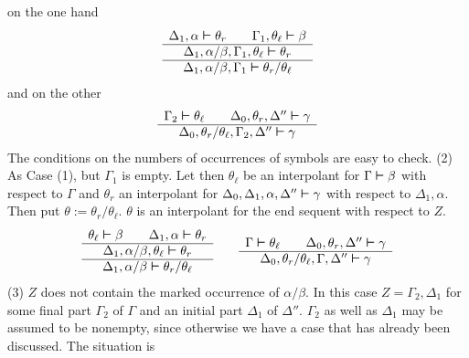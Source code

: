 on the one hand
\begin{equation}
\begin{array}{c}
\Delta_1, \alpha \boldsymbol{\vdash} \theta_r \qquad \Gamma_1, \theta_{\ell} \boldsymbol{\vdash}
    \beta \\\hline
\Delta_1, \alpha/\beta, \Gamma_1, \theta_{\ell} \boldsymbol{\vdash} \theta_r
    \\\hline
\Delta_1, \alpha/\beta, \Gamma_1 \boldsymbol{\vdash} \theta_r/\theta_{\ell}
\end{array}
\end{equation}
and on the other 
\begin{equation}
\begin{array}{c}
\Gamma_2 \boldsymbol{\vdash} \theta_{\ell} \qquad \Delta_0, \theta_r,
    \Delta ''\boldsymbol{\vdash} \gamma \\\hline
\Delta_0, \theta_r/\theta_{\ell}, \Gamma_2, \Delta'' \boldsymbol{\vdash}
\gamma
\end{array}
\end{equation}
The conditions on the numbers of occurrences of symbols are
easy to check. (2) As Case (1), but $\Gamma_1$ is empty.
Let then $\theta_{\ell}$ be an interpolant for $\Gamma \boldsymbol{\vdash}
\beta$ with respect to $\Gamma$ and $\theta_r$ an interpolant
for $\Delta_0, \Delta_1, \alpha, \Delta'' \boldsymbol{\vdash} \gamma$
with respect to $\Delta_1, \alpha$. Then put $\theta := \theta_r/
\theta_{\ell}$. $\theta$ is an interpolant for the end sequent
with respect to $Z$.
\begin{equation}
\begin{array}{c}
\theta_{\ell} \boldsymbol{\vdash} \beta \qquad \Delta_1, \alpha \boldsymbol{\vdash} \theta_r
    \\\hline
\Delta_1, \alpha/\beta, \theta_{\ell} \boldsymbol{\vdash} \theta_r \\\hline
\Delta_1, \alpha/\beta \boldsymbol{\vdash} \theta_r / \theta_{\ell}
\end{array}
\qquad
\begin{array}{c}
\Gamma \boldsymbol{\vdash} \theta_{\ell} \qquad \Delta_0, \theta_r, \Delta''
    \boldsymbol{\vdash} \gamma \\\hline
\Delta_0, \theta_r /\theta_{\ell}, \Gamma, \Delta'' \boldsymbol{\vdash}
    \gamma
\end{array}
\end{equation}
(3) $Z$ does not contain the marked occurrence of $\alpha/\beta$.
In this case $Z = \Gamma_2, \Delta_1$ for some final part $\Gamma_2$
of $\Gamma$ and an initial part $\Delta_1$ of $\Delta''$. $\Gamma_2$
as well as  $\Delta_1$ may be assumed to be nonempty, since otherwise
we have a case that has already been discussed. The situation is

